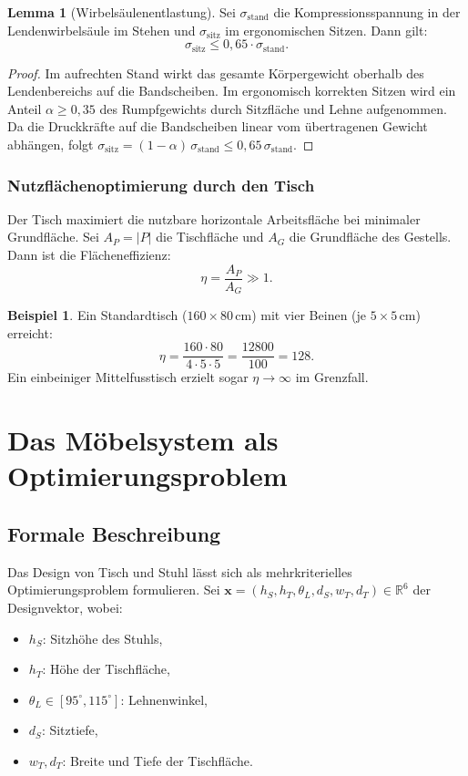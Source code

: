 \documentclass[a4paper,12pt]{article}
\theoremstyle{definition}
\newtheorem{beispiel}{Beispiel}
\newtheorem{lemma}{Lemma}
\begin{document}
\begin{lemma}[Wirbels\"{a}ulenentlastung]
\label{lem:entlastung}
	Sei $\sigma_{\mathrm{stand}}$ die Kompressionsspannung in der Lendenwirbels\"{a}ule im
	Stehen und $\sigma_{\mathrm{sitz}}$ im ergonomischen Sitzen. Dann gilt:
	\[
		\sigma_{\mathrm{sitz}} \leq 0{,}65 \cdot \sigma_{\mathrm{stand}}.
	\]
\end{lemma}

\begin{proof}
	Im aufrechten Stand wirkt das gesamte K\"{o}rpergewicht oberhalb des Lendenbereichs auf
	die Bandscheiben. Im ergonomisch korrekten Sitzen wird ein Anteil $\alpha \geq 0{,}35$
	des Rumpfgewichts durch Sitzfl\"{a}che und Lehne aufgenommen. Da die Druckkr\"{a}fte auf die
	Bandscheiben linear vom \"{u}bertragenen Gewicht abh\"{a}ngen, folgt
	$\sigma_{\mathrm{sitz}} = (1 - \alpha)\,\sigma_{\mathrm{stand}} \leq 0{,}65\,\sigma_{\mathrm{stand}}$.
\end{proof}

\subsubsection{Nutzfl\"{a}chenoptimierung durch den Tisch}

Der Tisch maximiert die nutzbare horizontale Arbeitsfl\"{a}che bei minimaler Grundfl\"{a}che.
Sei $A_P = |P|$ die Tischfl\"{a}che und $A_G$ die Grundfl\"{a}che des Gestells. Dann ist die
Fl\"{a}cheneffizienz:
\[
	\eta = \frac{A_P}{A_G} \gg 1.
\]

\begin{beispiel}
	Ein Standardtisch ($160 \times 80\,\mathrm{cm}$) mit vier Beinen (je $5 \times 5\,\mathrm{cm}$)
	erreicht:
	\[
		\eta = \frac{160 \cdot 80}{4 \cdot 5 \cdot 5} = \frac{12800}{100} = 128.
	\]
	Ein einbeiniger Mittelfusstisch erzielt sogar $\eta \to \infty$ im Grenzfall.
\end{beispiel}

\section{Das M\"{o}belsystem als Optimierungsproblem}

\subsection{Formale Beschreibung}

Das Design von Tisch und Stuhl l\"{a}sst sich als mehrkriterielles Optimierungsproblem
formulieren. Sei $\mathbf{x} = (h_S, h_T, \theta_L, d_S, w_T, d_T) \in \mathbb{R}^6$
der Designvektor, wobei:
\begin{itemize}
	\item $h_S$: Sitzh\"{o}he des Stuhls,
	\item $h_T$: H\"{o}he der Tischfl\"{a}che,
	\item $\theta_L \in [95^{\circ}, 115^{\circ}]$: Lehnenwinkel,
	\item $d_S$: Sitztiefe,
	\item $w_T, d_T$: Breite und Tiefe der Tischfl\"{a}che.
\end{itemize}
\end{document}
